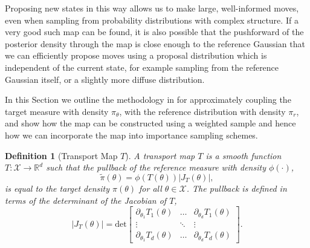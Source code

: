 \documentclass[final]{siamltex}
\newtheorem{dfn}{Definition}[section]
\begin{document}
Proposing new states in this way allows us to make large, well-informed
moves, even when sampling from probability distributions with complex structure.
If a very good such map can be found, it is also possible that the
pushforward of the posterior density through the map is close enough
to the reference Gaussian that we can efficiently
propose moves using a proposal distribution which is independent of
the current state, for example sampling from the reference Gaussian
itself, or a slightly more diffuse distribution.

In this Section we outline the methodology in
\cite{parno2018transport} for approximately coupling the target
measure with density
$\pi_{\theta}$, with the reference distribution with density $\pi_r$, and
show how the map can be constructed using a weighted sample
and hence how we can incorporate the map into importance sampling schemes.

\begin{dfn}[Transport Map $T$]
	A transport map $T$ is a smooth function $T\colon
        \mathcal{X}\rightarrow\mathbb{R}^d$ such that the {\it
          pullback} of the reference measure with density $\phi(\cdot)$,
	\begin{equation}\label{eq:pullback}
		\tilde{\pi}(\theta) = \phi(T(\theta))|J_T(\theta)|,
	\end{equation}
	is equal to the target density $\pi(\theta)$ for all $\theta \in \mathcal{X}$. The pullback is defined in terms of the determinant of the Jacobian of $T$,
	\begin{equation}
		|J_T(\theta)| = \text{det}\begin{bmatrix} \partial_{\theta_1} T_1(\theta) & \dots & \partial_{\theta_d} T_1(\theta) \\ \vdots & \ddots & \vdots \\ \partial_{\theta_1} T_d(\theta) & \dots & \partial_{\theta_d} T_d(\theta) \end{bmatrix}.
	\end{equation}
\end{dfn}

\end{document}
